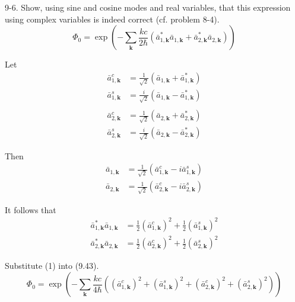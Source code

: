 \documentclass[12pt]{article}
\begin{document}
9-6.
Show, using sine and cosine modes and real variables,
that this expression using complex variables is indeed
correct (cf. problem 8-4).
\begin{equation*}
\Phi_0=\exp\left(
-\sum_{\mathbf k}
\frac{kc}{2\hbar}
\left(
\bar a_{1,\mathbf k}^*
\bar a_{1,\mathbf k}
+
\bar a_{2,\mathbf k}^*
\bar a_{2,\mathbf k}
\right)
\right)
\tag{9.43}
\end{equation*}

Let
\begin{align*}
\bar a_{1,\mathbf k}^c&=\frac{1}{\sqrt2}(\bar a_{1,\mathbf k}+\bar a_{1,\mathbf k}^*)
\\
\bar a_{1,\mathbf k}^s&=\frac{i}{\sqrt2}(\bar a_{1,\mathbf k}-\bar a_{1,\mathbf k}^*)
\\
\\
\bar a_{2,\mathbf k}^c&=\frac{1}{\sqrt2}(\bar a_{2,\mathbf k}+\bar a_{2,\mathbf k}^*)
\\
\bar a_{2,\mathbf k}^s&=\frac{i}{\sqrt2}(\bar a_{2,\mathbf k}-\bar a_{2,\mathbf k}^*)
\end{align*}

Then
\begin{align*}
\bar a_{1,\mathbf k}&=\frac{1}{\sqrt2}(\bar a_{1,\mathbf k}^c-i\bar a_{1,\mathbf k}^s)
\\
\bar a_{2,\mathbf k}&=\frac{1}{\sqrt2}(\bar a_{2,\mathbf k}^c-i\bar a_{2,\mathbf k}^s)
\end{align*}

It follows that
\begin{equation*}
\begin{aligned}
\bar a_{1,\mathbf k}^*\bar a_{1,\mathbf k}
&=\frac{1}{2}(\bar a_{1,\mathbf k}^c)^2+\frac{1}{2}(\bar a_{1,\mathbf k}^s)^2
\\
\bar a_{2,\mathbf k}^*\bar a_{2,\mathbf k}
&=\frac{1}{2}(\bar a_{2,\mathbf k}^c)^2+\frac{1}{2}(\bar a_{2,\mathbf k}^s)^2
\end{aligned}
\tag{1}
\end{equation*}

Substitute (1) into (9.43).
\begin{equation*}
\Phi_0=\exp\left(
-\sum_{\mathbf k}
\frac{kc}{4\hbar}
\left(
(\bar a_{1,\mathbf k}^c)^2+(\bar a_{1,\mathbf k}^s)^2
+
(\bar a_{2,\mathbf k}^c)^2+(\bar a_{2,\mathbf k}^s)^2
\right)
\right)
\end{equation*}

\end{document}
